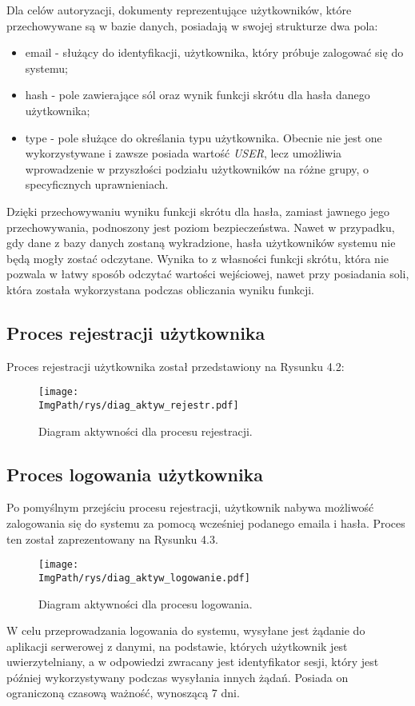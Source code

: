 \documentclass[a4paper,12pt,twoside,openany]{report}
\newcommand{\ImgPath}{.}
\begin{document}
Dla celów autoryzacji, dokumenty reprezentujące użytkowników, które przechowywane są w bazie danych, posiadają w swojej strukturze dwa pola:
\begin{itemize}
	\item email - służący do identyfikacji, użytkownika, który próbuje zalogować się do systemu;
	
	\item hash - pole zawierające sól oraz wynik funkcji skrótu dla hasła danego użytkownika;
	
	\item type - pole służące do określania typu użytkownika. Obecnie nie jest one wykorzystywane i zawsze posiada wartość \textit{USER}, lecz umożliwia wprowadzenie w przyszłości podziału użytkowników na różne grupy, o specyficznych uprawnieniach.
	
\end{itemize}
Dzięki przechowywaniu wyniku funkcji skrótu dla hasła, zamiast jawnego jego przechowywania, podnoszony jest poziom bezpieczeństwa. Nawet w przypadku, gdy dane z bazy danych zostaną wykradzione, hasła użytkowników systemu nie będą mogły zostać odczytane. Wynika to z własności funkcji skrótu, która nie pozwala w łatwy sposób odczytać wartości wejściowej, nawet przy posiadania soli, która została wykorzystana podczas obliczania wyniku funkcji.


\subsection{Proces rejestracji użytkownika}
Proces rejestracji użytkownika został przedstawiony na Rysunku 4.2:
 \begin{figure}[!htbp]
	\begin{center}
		\centering
		\texttt{[image: \\ImgPath/rys/diag\_aktyw\_rejestr.pdf]}
	\end{center}
	\caption{Diagram aktywności dla procesu rejestracji.}
	\label{diagramAktywnosciRejstracja}
\end{figure}
\newpage

\subsection{Proces logowania użytkownika}
Po pomyślnym przejściu procesu rejestracji, użytkownik nabywa możliwość zalogowania się do systemu za pomocą wcześniej podanego emaila i hasła. Proces ten został zaprezentowany na Rysunku 4.3.


\begin{figure}[!htbp]
	\begin{center}
		\centering
		\texttt{[image: \\ImgPath/rys/diag\_aktyw\_logowanie.pdf]}
	\end{center}
	\caption{Diagram aktywności dla procesu logowania.}
	\label{diagramAktywnosciLogowanie}
\end{figure}
\newpage
W celu przeprowadzania logowania do systemu, wysyłane jest żądanie do aplikacji serwerowej z danymi, na podstawie, których użytkownik jest uwierzytelniany, a w odpowiedzi zwracany jest identyfikator sesji, który jest później wykorzystywany podczas wysyłania innych żądań. Posiada on ograniczoną czasową ważność, wynoszącą 7 dni.
\end{document}
